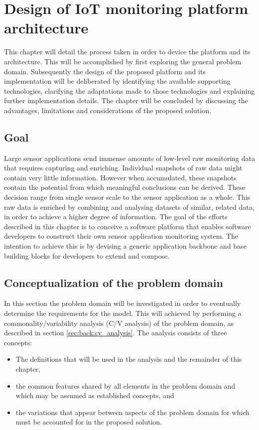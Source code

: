 \newcommand{\archid}{1}
\chapter{Design of IoT monitoring platform architecture}
\label{ch:architecture}
This chapter will detail the process taken in order to device the platform and its architecture. This will be accomplished by first exploring the general problem domain. Subsequently the design of the proposed platform and its implementation will be deliberated by identifying the available supporting technologies, clarifying the adaptations made to those technologies and explaining further implementation details. The chapter will be concluded by discussing the advantages, limitations and considerations of the proposed solution.
\section{Goal}
Large sensor applications send immense amounts of low-level raw monitoring data that requires capturing and enriching. Individual snapshots of raw data might contain very little information. However when accumulated, these snapshots contain the potential from which meaningful conclusions can be derived. These decision range from single sensor scale to the sensor application as a whole. This raw data is enriched by combining and analysing datasets of similar, related data, in order to achieve a higher degree of information. The goal of the efforts described in this chapter is to conceive a software platform that enables software developers to construct their own sensor application monitoring system. The intention to achieve this is by devising a generic application backbone and base building blocks for  developers to extend and compose.  
\section{Conceptualization of the problem domain}
In this section the problem domain will be investigated in order to eventually determine the requirements for the model. This will achieved by performing a commonality/variability analysis (C/V analysis) of the problem domain, as described in section \ref{sec:back:cv_analysis}. The analysis consists of three concepts:
\begin{itemize}
\nospace
\item The definitions that will be used in the analysis and the remainder of this chapter, 
\item the common features shared by all elements in the problem domain and which may be assumed as established concepts, and 
\item the variations that appear between aspects of the problem domain for which must be accounted for in the proposed solution.
\end{itemize}

